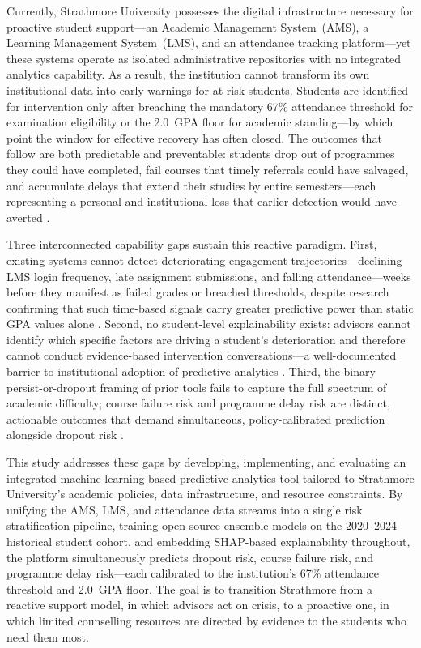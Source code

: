 \documentclass[12pt]{report}
\begin{document}
Currently, Strathmore University possesses the digital infrastructure necessary for
proactive student support---an Academic Management System~(AMS), a Learning
Management System~(LMS), and an attendance tracking platform---yet these systems
operate as isolated administrative repositories with no integrated analytics
capability. As a result, the institution cannot transform its own institutional
data into early warnings for at-risk students. Students are identified for
intervention only after breaching the mandatory 67\% attendance threshold for
examination eligibility or the 2.0~GPA floor for academic standing---by which
point the window for effective recovery has often closed. The outcomes that
follow are both predictable and preventable: students drop out of programmes they
could have completed, fail courses that timely referrals could have salvaged, and
accumulate delays that extend their studies by entire semesters---each
representing a personal and institutional loss that earlier detection would have
averted \parencite{bettahi2025, esmael2024, gsu2024_}.

Three interconnected capability gaps sustain this reactive paradigm. First,
existing systems cannot detect deteriorating engagement trajectories---declining
LMS login frequency, late assignment submissions, and falling attendance---weeks
before they manifest as failed grades or breached thresholds, despite research
confirming that such time-based signals carry greater predictive power than
static GPA values alone \parencite{Dirin2022, Morris2005}. Second, no
student-level explainability exists: advisors cannot identify which specific
factors are driving a student's deterioration and therefore cannot conduct
evidence-based intervention conversations---a well-documented barrier to
institutional adoption of predictive analytics \parencite{kwakye2025, zhang2021}.
Third, the binary persist-or-dropout framing of prior tools fails to capture the
full spectrum of academic difficulty; course failure risk and programme delay
risk are distinct, actionable outcomes that demand simultaneous, policy-calibrated
prediction alongside dropout risk \parencite{bettahi2025}.

This study addresses these gaps by developing, implementing, and evaluating an
integrated machine learning-based predictive analytics tool tailored to
Strathmore University's academic policies, data infrastructure, and resource
constraints. By unifying the AMS, LMS, and attendance data streams into a single
risk stratification pipeline, training open-source ensemble models on the
2020--2024 historical student cohort, and embedding SHAP-based explainability
throughout, the platform simultaneously predicts dropout risk, course failure
risk, and programme delay risk---each calibrated to the institution's 67\%
attendance threshold and 2.0~GPA floor. The goal is to transition Strathmore
from a reactive support model, in which advisors act on crisis, to a proactive
one, in which limited counselling resources are directed by evidence to the
students who need them most.
\end{document}
